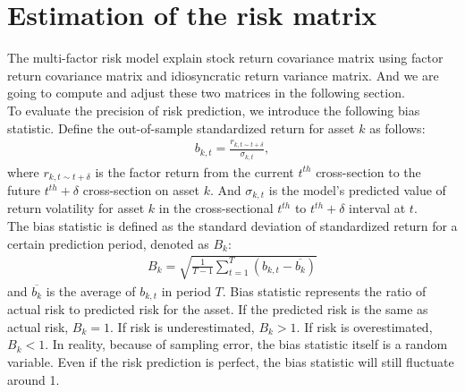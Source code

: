 \documentclass[10pt]{article}
\begin{document}
\section{Estimation of the risk matrix}
The multi-factor risk model explain stock return covariance matrix using factor return covariance matrix and idiosyncratic return variance matrix. And we are going to compute and adjust these two matrices in the following section.\\
To evaluate the precision of risk prediction, we introduce the following bias statistic. Define the out-of-sample standardized return for asset $k$ as follows:\\
\begin{align}
    b_{k,t}=\frac{r_{k,t\sim t+\delta}}{\sigma_{k,t}},
\end{align}
where $r_{k,t\sim t+\delta}$ is the factor return from the current $t^{th}$ cross-section to the future $t^{th}+\delta$ cross-section on asset $k$. And $\sigma_{k,t}$ is the model's predicted value of return volatility for asset $k$ in the cross-sectional $t^{th}$ to $t^{th}+\delta$ interval at $t$.\\

The bias statistic is defined as the standard deviation of standardized return for a certain prediction period, denoted as $B_k$:
\begin{align}
    B_k=\sqrt{\frac{1}{T-1}\sum^T_{t=1}(b_{k,t}-\overline{b_k})}
\end{align}
and $\overline{b_k}$ is the average of $b_{k,t}$ in period $T$.
Bias statistic represents the ratio of actual risk to predicted risk for the asset. If the predicted risk is the same as actual risk, $B_k=1$. If risk is underestimated, $B_k>1$. If risk is overestimated, $B_k<1$. In reality, because of sampling error, the bias statistic itself is a random variable. Even if the risk prediction is perfect, the bias statistic will still fluctuate around 1.
\end{document}
